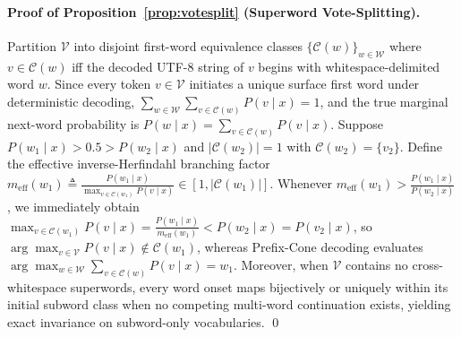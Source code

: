\documentclass[11pt,a4paper]{article}
\begin{document}
\paragraph{Proof of Proposition~\ref{prop:votesplit} (Superword Vote-Splitting).}
Partition $\mathcal{V}$ into disjoint first-word equivalence classes $\{\mathcal{C}(w)\}_{w \in \mathcal{W}}$ where $v \in \mathcal{C}(w)$ iff the decoded UTF-8 string of $v$ begins with whitespace-delimited word $w$. Since every token $v \in \mathcal{V}$ initiates a unique surface first word under deterministic decoding, $\sum_{w \in \mathcal{W}} \sum_{v \in \mathcal{C}(w)} P(v \mid x) = 1$, and the true marginal next-word probability is $P(w \mid x) = \sum_{v \in \mathcal{C}(w)} P(v \mid x)$. Suppose $P(w_1 \mid x) > 0.5 > P(w_2 \mid x)$ and $|\mathcal{C}(w_2)| = 1$ with $\mathcal{C}(w_2)=\{v_2\}$. Define the effective inverse-Herfindahl branching factor $m_{\text{eff}}(w_1) \triangleq \frac{P(w_1 \mid x)}{\max_{v \in \mathcal{C}(w_1)} P(v \mid x)} \in [1, |\mathcal{C}(w_1)|]$. Whenever $m_{\text{eff}}(w_1) > \frac{P(w_1 \mid x)}{P(w_2 \mid x)}$, we immediately obtain $\max_{v \in \mathcal{C}(w_1)} P(v \mid x) = \frac{P(w_1 \mid x)}{m_{\text{eff}}(w_1)} < P(w_2 \mid x) = P(v_2 \mid x)$, so $\arg\max_{v \in \mathcal{V}} P(v \mid x) \notin \mathcal{C}(w_1)$, whereas Prefix-Cone decoding evaluates $\arg\max_{w \in \mathcal{W}} \sum_{v \in \mathcal{C}(w)} P(v \mid x) = w_1$. Moreover, when $\mathcal{V}$ contains no cross-whitespace superwords, every word onset maps bijectively or uniquely within its initial subword class when no competing multi-word continuation exists, yielding exact invariance on subword-only vocabularies. \qed
\end{document}
